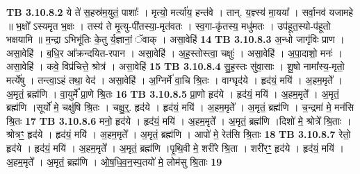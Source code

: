 \documentclass[17pt]{extarticle}
\begin{document}
{{{{{{{{{{{{{{{{{{{{{{                  \newline
                                \textbf{ TB 3.10.8.2} \newline
                  ये ते॑ स॒हस्र॑म॒युतं॒ पाशाः᳚ । मृत्यो॒ मर्त्या॑य॒ हन्त॑वे । तान्. य॒ज्ञ्स्य॑ मा॒यया᳚ । सर्वा॒नव॑ यजामहे ॥ भ॒क्षो᳚ ऽस्यमृत भ॒क्षः । तस्य॑ ते मृ॒त्यु-पी॑तस्या॒-मृत॑वतः । स्व॒गा-कृ॑तस्य॒ मधु॑मतः । उप॑हूत॒स्यो-प॑हूतो भक्षयामि ॥ म॒न्द्रा ऽभिभू॑तिः के॒तु र्य॒ज्ञानां॒ ॅवाक् । असा॒वेहि॑ \textbf{ 14} \newline
                  \newline
                                \textbf{ TB 3.10.8.3} \newline
                  अ॒न्धो जागृ॑विः प्राण । असा॒वेहि॑ । ब॒धि॒र आ᳚क्रन्दयित-रपान । असा॒वेहि॑ । अ॒ह॒स्तोस्त्वा॒ चक्षुः॑ । असा॒वेहि॑ । अ॒पा॒दाशो॒ मनः॑ । असा॒वेहि॑ । कवे॒ विप्र॑चित्ते॒ श्रोत्र॑ । असा॒वेहि॑ \textbf{ 15} \newline
                  \newline
                                \textbf{ TB 3.10.8.4} \newline
                  सु॒ह॒स्तः सु॑वा॒साः । शू॒षो नामा᳚स्य॒-मृतो॒ मर्त्ये॑षु । तन्त्वा॒ऽहं तथा॒ वेद॑ । असा॒वेहि॑ । अ॒ग्निर्मे॑ वा॒चि श्रि॒तः । वाग्घृद॑ये । हृद॑यं॒ मयि॑ । अ॒हम॒मृते᳚ । अ॒मृतं॒ ब्रह्म॑णि । वा॒युर्मे᳚ प्रा॒णे श्रि॒तः \textbf{ 16} \newline
                  \newline
                                \textbf{ TB 3.10.8.5} \newline
                  प्रा॒णो हृद॑ये । हृद॑यं॒ मयि॑ । अ॒हम॒मृते᳚ । अ॒मृतं॒ ब्रह्म॑णि ।सूर्यो॑ मे॒ चक्षु॑षि श्रि॒तः । चक्षु॒र्॒. हृद॑ये । हृद॑यं॒ मयि॑ । अ॒हम॒मृते᳚ । अ॒मृतं॒ ब्रह्म॑णि । च॒न्द्रमा॑ मे॒ मन॑सि श्रि॒तः \textbf{ 17} \newline
                  \newline
                                \textbf{ TB 3.10.8.6} \newline
                  मनो॒ हृद॑ये । हृद॑यं॒ मयि॑ । अ॒हम॒मृते᳚ । अ॒मृतं॒ ब्रह्म॑णि ।दिशो॑ मे॒ श्रोत्रे᳚ श्रि॒ताः । श्रोत्रꣳ॒॒ हृद॑ये । हृद॑यं॒ मयि॑ । अ॒हम॒मृते᳚ । अ॒मृतं॒ ब्रह्म॑णि । आपो॑ मे॒ रेत॑सि श्रि॒ताः \textbf{ 18} \newline
                  \newline
                                \textbf{ TB 3.10.8.7} \newline
                  रेतो॒ हृद॑ये । हृद॑यं॒ मयि॑ । अ॒हम॒मृते᳚ । अ॒मृतं॒ ब्रह्म॑णि ।पृ॒थि॒वी मे॒ शरी॑रे श्रि॒ता । शरी॑रꣳ॒॒ हृद॑ये । हृद॑यं॒ मयि॑ । अ॒हम॒मृते᳚ । अ॒मृतं॒ ब्रह्म॑णि । ओ॒ष॒धि॒व॒न॒स्प॒तयो॑ मे॒ लोम॑सु श्रि॒ताः \textbf{ 19} \newline
}}}}}}}}}}}}}}}}}}}}}}
\end{document}
